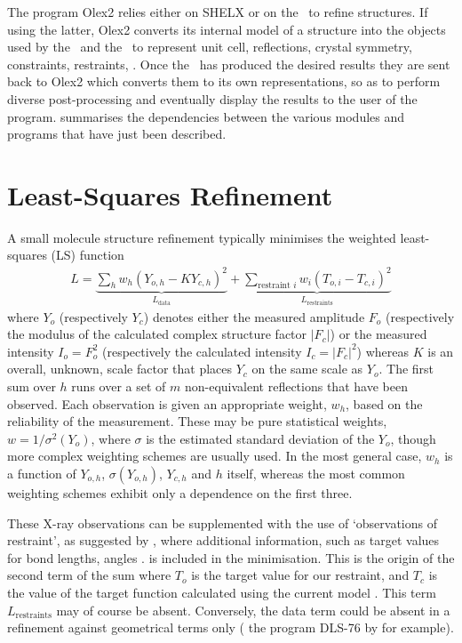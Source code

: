 \documentclass[11pt]{article}
\newcommand{\modulus}[1]{\left| #1 \right|}
\begin{document}
The program Olex2 relies either on SHELX or on the \smtbx\ to refine structures. If using the latter, Olex2 converts its internal model of a structure into the objects used by the \smtbx\ and the \cctbx\ to represent unit cell, reflections, crystal symmetry, constraints, restraints, . Once the \smtbx\ has produced the desired results they are sent back to Olex2 which converts them to its own representations, so as to perform diverse post-processing and eventually display the results to the user of the program.  summarises the dependencies between the various modules and programs that have just been described.  

\section{Least-Squares Refinement}
\newcommand{\data}{\text{data}}
\newcommand{\restraints}{\text{restraints}}

A small molecule structure refinement typically minimises the weighted least-squares (LS) function
\begin{align}
L = \underbrace{\sum_h w_h \left( Y_{o,h} - K Y_{c,h} \right)^2}_{L_\data}
     + \underbrace{\sum_{\text{restraint } i} w_i \left( T_{o,i} - T_{c,i} \right)^2}_{L_\restraints}
\label{eqn:L:def}
\end{align}
where $Y_o$ (respectively $Y_c$) denotes either the measured amplitude $F_o$ (respectively the modulus of the calculated complex structure factor $\modulus{F_c}$) or the measured intensity $I_o = F_o^2$ (respectively the calculated intensity $I_c = \modulus{F_c}^2$) whereas $K$ is an overall, unknown, scale factor that places $Y_c$ on the same scale as $Y_o$. The first sum over $h$ runs over a set of $m$ non-equivalent reflections that have been observed. Each observation is given an appropriate weight, $w_h$, based on the reliability of the measurement. These may be pure statistical weights, $w = 1/\sigma^2(Y_o)$, where $\sigma$ is the estimated standard deviation of the $Y_o$, though more complex weighting schemes are usually used. In the most general case, $w_h$ is a function of $Y_{o,h}$, $\sigma(Y_{o,h})$, $Y_{c,h}$ and $h$ itself, whereas the most common weighting schemes exhibit only a dependence on the first three.

These X-ray observations can be supplemented with the use of `observations of restraint', as suggested by , where additional information, such as target values for bond lengths, angles . is included in the minimisation. This is the origin of the second term of the sum where $T_o$ is the target value for our restraint, and $T_c$ is the value of the target function calculated using the current model . This term $L_\restraints$ may of course be absent. Conversely, the data term could be absent in a refinement against geometrical terms only ( the program DLS-76 by  for example).
\end{document}
